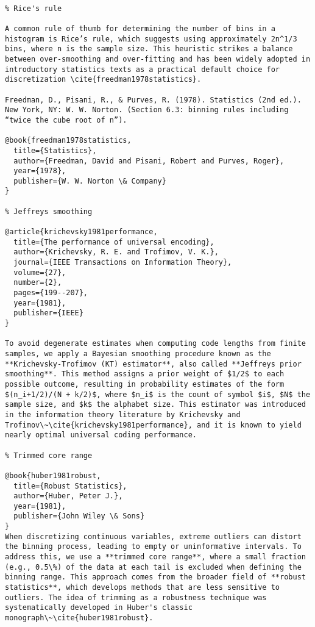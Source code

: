 \begin{verbatim}

% Rice's rule

A common rule of thumb for determining the number of bins in a histogram is Rice’s rule, which suggests using approximately 2n^1/3 bins, where n is the sample size. This heuristic strikes a balance between over-smoothing and over-fitting and has been widely adopted in introductory statistics texts as a practical default choice for discretization \cite{freedman1978statistics}.

Freedman, D., Pisani, R., & Purves, R. (1978). Statistics (2nd ed.). New York, NY: W. W. Norton. (Section 6.3: binning rules including “twice the cube root of n”).

@book{freedman1978statistics,
  title={Statistics},
  author={Freedman, David and Pisani, Robert and Purves, Roger},
  year={1978},
  publisher={W. W. Norton \& Company}
}

% Jeffreys smoothing

@article{krichevsky1981performance,
  title={The performance of universal encoding},
  author={Krichevsky, R. E. and Trofimov, V. K.},
  journal={IEEE Transactions on Information Theory},
  volume={27},
  number={2},
  pages={199--207},
  year={1981},
  publisher={IEEE}
}

To avoid degenerate estimates when computing code lengths from finite samples, we apply a Bayesian smoothing procedure known as the **Krichevsky-Trofimov (KT) estimator**, also called **Jeffreys prior smoothing**. This method assigns a prior weight of $1/2$ to each possible outcome, resulting in probability estimates of the form $(n_i+1/2)/(N + k/2)$, where $n_i$ is the count of symbol $i$, $N$ the sample size, and $k$ the alphabet size. This estimator was introduced in the information theory literature by Krichevsky and Trofimov\~\cite{krichevsky1981performance}, and it is known to yield nearly optimal universal coding performance.

% Trimmed core range

@book{huber1981robust,
  title={Robust Statistics},
  author={Huber, Peter J.},
  year={1981},
  publisher={John Wiley \& Sons}
}
When discretizing continuous variables, extreme outliers can distort the binning process, leading to empty or uninformative intervals. To address this, we use a **trimmed core range**, where a small fraction (e.g., 0.5\%) of the data at each tail is excluded when defining the binning range. This approach comes from the broader field of **robust statistics**, which develops methods that are less sensitive to outliers. The idea of trimming as a robustness technique was systematically developed in Huber's classic monograph\~\cite{huber1981robust}.

\end{verbatim}




